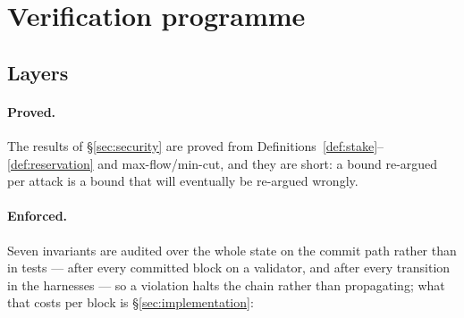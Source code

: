 \section{Verification programme}
\label{sec:verification}

\subsection{Layers}

\paragraph{Proved.} The results of \S\ref{sec:security} are proved from
Definitions~\ref{def:stake}--\ref{def:reservation} and max-flow/min-cut, and they are
short: a bound re-argued per attack is a bound that will eventually be re-argued wrongly.

\paragraph{Enforced.} Seven invariants are audited over the whole state on the commit path
rather than in tests --- after every committed block on a validator, and after every
transition in the harnesses --- so a violation halts the chain rather than propagating;
what that costs per block is \S\ref{sec:implementation}:


